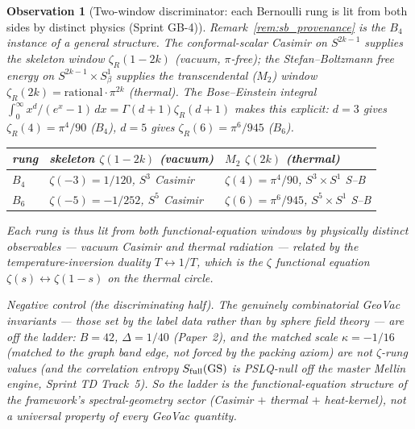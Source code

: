 \documentclass[11pt]{article}
\newtheorem{observation}{Observation}
\begin{document}
\begin{observation}[Two-window discriminator: each Bernoulli rung is lit
from both sides by distinct physics (Sprint GB-4)]
\label{obs:two_window_duality}
Remark~\ref{rem:sb_provenance} is the $B_4$ instance of a general
structure. The conformal-scalar Casimir on $S^{2k-1}$ supplies the
\emph{skeleton} window $\zeta_R(1-2k)$ (vacuum, $\pi$-free); the
Stefan--Boltzmann free energy on $S^{2k-1}\times S^1_\beta$ supplies the
\emph{transcendental} ($M_2$) window $\zeta_R(2k) =
\text{rational}\cdot\pi^{2k}$ (thermal). The Bose--Einstein integral
$\int_0^\infty x^d/(e^x-1)\,dx = \Gamma(d{+}1)\zeta_R(d{+}1)$ makes this
explicit: $d=3$ gives $\zeta_R(4) = \pi^4/90$ ($B_4$), $d=5$ gives
$\zeta_R(6) = \pi^6/945$ ($B_6$).

\begin{center}
\small
\begin{tabular}{p{1.0cm} p{3.4cm} p{3.4cm}}
\toprule
rung & skeleton $\zeta(1{-}2k)$ (vacuum) & $M_2$ $\zeta(2k)$ (thermal) \\
\midrule
$B_4$ & $\zeta(-3)=1/120$, $S^3$ Casimir & $\zeta(4)=\pi^4/90$, $S^3{\times}S^1$ S--B \\
$B_6$ & $\zeta(-5)={-}1/252$, $S^5$ Casimir & $\zeta(6)=\pi^6/945$, $S^5{\times}S^1$ S--B \\
\bottomrule
\end{tabular}
\end{center}

Each rung is thus lit from \emph{both} functional-equation windows by
\emph{physically distinct} observables --- vacuum Casimir and thermal
radiation --- related by the temperature-inversion duality $T
\leftrightarrow 1/T$, which is the $\zeta$ functional equation
$\zeta(s)\leftrightarrow\zeta(1{-}s)$ on the thermal circle.

\emph{Negative control (the discriminating half).} The genuinely
combinatorial GeoVac invariants --- those set by the label data
rather than by sphere field theory --- are \emph{off} the ladder:
$B = 42$, $\Delta = 1/40$ (Paper~2), and the matched scale
$\kappa = -1/16$ (matched to the graph band edge, not forced by the
packing axiom) are not
$\zeta$-rung values (and the correlation entropy $S_{\rm full}(\mathrm{GS})$
is PSLQ-null off the master Mellin engine, Sprint TD Track~5). So the
ladder is the functional-equation structure of the framework's
\emph{spectral-geometry} sector (Casimir $+$ thermal $+$ heat-kernel),
\emph{not} a universal property of every GeoVac quantity.


\end{observation}
\end{document}

